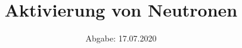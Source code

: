 

\subject{Versuch V702}
\title{Aktivierung von Neutronen}
\date{%
  Abgabe: 17.07.2020
}



\maketitle
\thispagestyle{empty}
\tableofcontents
\newpage






\newpage
\printbibliography{}


